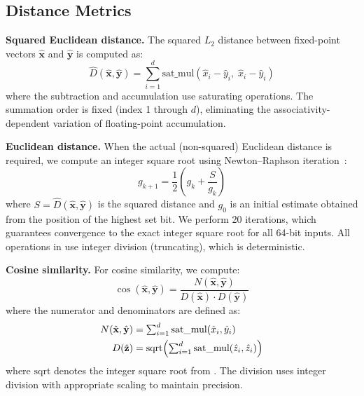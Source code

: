 \documentclass[10pt,journal]{IEEEtran}
\begin{document}
\subsection{Distance Metrics}

\textbf{Squared Euclidean distance.} The squared $L_2$ distance between fixed-point vectors $\hat{\mathbf{x}}$ and $\hat{\mathbf{y}}$ is computed as:
\begin{equation}
  \label{eq:fp_l2}
  \hat{D}(\hat{\mathbf{x}}, \hat{\mathbf{y}}) = \sum_{i=1}^{d} \text{sat\_mul}(\hat{x}_i - \hat{y}_i,\; \hat{x}_i - \hat{y}_i)
\end{equation}
where the subtraction and accumulation use saturating operations. The summation order is fixed (index 1 through $d$), eliminating the associativity-dependent variation of floating-point accumulation.

\textbf{Euclidean distance.} When the actual (non-squared) Euclidean distance is required, we compute an integer square root using Newton--Raphson iteration~\cite{schoenmakers2023fixedpoint}:
\begin{equation}
  \label{eq:newton}
  g_{k+1} = \frac{1}{2}\left(g_k + \frac{S}{g_k}\right)
\end{equation}
where $S = \hat{D}(\hat{\mathbf{x}}, \hat{\mathbf{y}})$ is the squared distance and $g_0$ is an initial estimate obtained from the position of the highest set bit. We perform 20 iterations, which guarantees convergence to the exact integer square root for all 64-bit inputs. All operations in  use integer division (truncating), which is deterministic.

\textbf{Cosine similarity.} For cosine similarity, we compute:
\begin{equation}
  \cos(\hat{\mathbf{x}}, \hat{\mathbf{y}}) = \frac{N(\hat{\mathbf{x}}, \hat{\mathbf{y}})}{D(\hat{\mathbf{x}}) \cdot D(\hat{\mathbf{y}})}
\end{equation}
where the numerator and denominators are defined as:
\begin{align}
  N(\hat{\mathbf{x}}, \hat{\mathbf{y}}) &= \textstyle\sum_{i=1}^{d} \text{sat\_mul}(\hat{x}_i, \hat{y}_i) \notag\\
  D(\hat{\mathbf{z}}) &= \mathrm{sqrt}\!\left(\textstyle\sum_{i=1}^{d} \text{sat\_mul}(\hat{z}_i, \hat{z}_i)\right)
\end{align}
where $\mathrm{sqrt}$ denotes the integer square root from . The division uses integer division with appropriate scaling to maintain precision.
\end{document}
